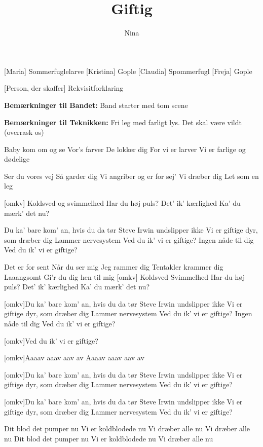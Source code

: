 \documentclass[a4paper,11pt]{article}
\title{Giftig}
\author{Nina}
\begin{document}
\maketitle

\begin{roles}
[Maria] Sommerfuglelarve
[Kristina] Gople
[Claudia] Spommerfugl
[Freja] Gople
\end{roles}

\begin{props}
    [Person, der skaffer] Rekvisitforklaring
\end{props}

\textbf{Bemærkninger til Bandet:} Band starter med tom scene

\textbf{Bemærkninger til Teknikken:} Fri leg med farligt lys. Det skal være vildt (overrask os)

\begin{song}
  Baby kom om og se
Vor’s farver
De lokker dig
For vi er larver
Vi er farlige
og dødelige

 Ser du vores vej
Så garder dig
Vi angriber
og er for sej’
Vi dræber dig
Let som en leg


[omkv] Koldsved
og svimmelhed
Har du høj puls?
Det’ ik’ kærlighed
Ka’ du mærk’ det nu?

Du ka’ bare kom’ an, hvis du da tør
Steve Irwin undslipper ikke
Vi er giftige dyr, som dræber dig
Lammer nervesystem
Ved du ik’ vi er giftige?
Ingen nåde til dig
Ved du ik’ vi er giftige?

  Det er for sent
Når du ser mig
Jeg rammer dig
Tentakler krammer dig 
Laaangsomt
Gi’r du dig hen til mig
[omkv] Koldsved
Svimmelhed
Har du høj puls?
Det’ ik’ kærlighed
Ka’ du mærk’ det nu?

[omkv]Du ka’ bare kom’ an, hvis du da tør
Steve Irwin undslipper ikke
Vi er giftige dyr, som dræber dig
Lammer nervesystem
Ved du ik’ vi er giftige?
Ingen nåde til dig
Ved du ik’ vi er giftige?

[omkv]Ved du ik’ vi er giftige?

[omkv]Aaaav aaav aav av
Aaaav aaav aav av

[omkv]Du ka’ bare kom’ an, hvis du da tør
Steve Irwin undslipper ikke
Vi er giftige dyr, som dræber dig
Lammer nervesystem
Ved du ik’ vi er giftige?

[omkv]Du ka’ bare kom’ an, hvis du da tør
Steve Irwin undslipper ikke
Vi er giftige dyr, som dræber dig
Lammer nervesystem
Ved du ik’ vi er giftige?

 Dit blod det pumper nu
Vi er koldblodede nu
Vi dræber alle nu
Vi dræber alle nu
Dit blod det pumper nu
Vi er koldblodede nu
Vi dræber alle nu

\end{song}
\end{document}
